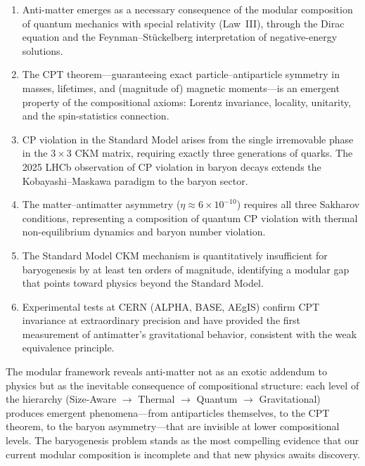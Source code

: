 \documentclass[12pt]{article}
\theoremstyle{definition}
\theoremstyle{remark}
\begin{document}
\begin{enumerate}
    \item Anti-matter emerges as a necessary consequence of the modular composition
    of quantum mechanics with special relativity (Law~III), through the Dirac equation
    and the Feynman--St\"uckelberg interpretation of negative-energy solutions.

    \item The CPT theorem---guaranteeing exact particle--antiparticle symmetry in
    masses, lifetimes, and (magnitude of) magnetic moments---is an emergent property
    of the compositional axioms: Lorentz invariance, locality, unitarity, and the
    spin-statistics connection.

    \item CP violation in the Standard Model arises from the single irremovable phase
    in the $3 \times 3$ CKM matrix, requiring exactly three generations of quarks.
    The 2025 LHCb observation of CP violation in baryon decays extends the
    Kobayashi--Maskawa paradigm to the baryon sector.

    \item The matter--antimatter asymmetry ($\eta \approx 6 \times 10^{-10}$) requires
    all three Sakharov conditions, representing a composition of quantum CP violation
    with thermal non-equilibrium dynamics and baryon number violation.

    \item The Standard Model CKM mechanism is quantitatively insufficient for
    baryogenesis by at least ten orders of magnitude, identifying a modular gap
    that points toward physics beyond the Standard Model.

    \item Experimental tests at CERN (ALPHA, BASE, AEgIS) confirm CPT invariance
    at extraordinary precision and have provided the first measurement of antimatter's
    gravitational behavior, consistent with the weak equivalence principle.
\end{enumerate}

The modular framework reveals anti-matter not as an exotic addendum to physics but as
the inevitable consequence of compositional structure: each level of the hierarchy
(Size-Aware $\to$ Thermal $\to$ Quantum $\to$ Gravitational) produces emergent
phenomena---from antiparticles themselves, to the CPT theorem, to the baryon
asymmetry---that are invisible at lower compositional levels. The baryogenesis
problem stands as the most compelling evidence that our current modular composition
is incomplete and that new physics awaits discovery.
\end{document}
